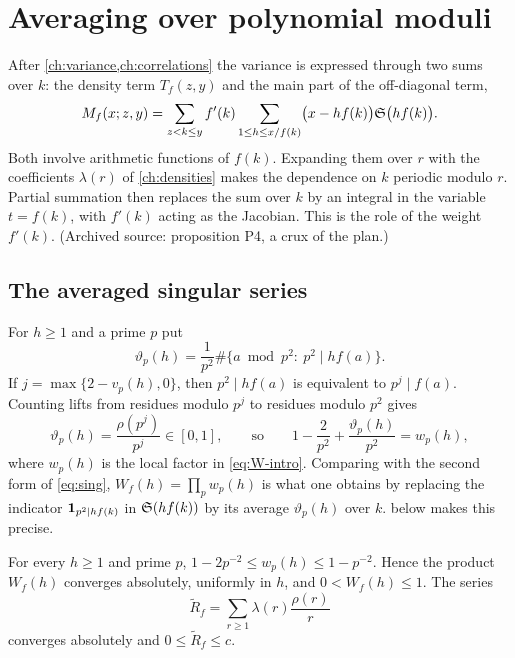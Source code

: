 \chapter{Averaging over polynomial moduli}\label{ch:averaging}

After \cref{ch:variance,ch:correlations} the variance is expressed through two sums over $k$: the density term $T_f(z,y)$ and the main part of the off-diagonal term,
\begin{equation}\label{eq:Mf}
M_f(x;z,y)=\sum_{z<k\le y}f'(k)\sum_{1\le h\le x/f(k)}\bigl(x-hf(k)\bigr)\mathfrak S\bigl(hf(k)\bigr).
\end{equation}
Both involve arithmetic functions of $f(k)$. Expanding them over $r$ with the coefficients $\lambda(r)$ of \cref{ch:densities} makes the dependence on $k$ periodic modulo $r$. Partial summation then replaces the sum over $k$ by an integral in the variable $t=f(k)$, with $f'(k)$ acting as the Jacobian. This is the role of the weight $f'(k)$. (Archived source: proposition P4, a crux of the plan.)

\section{The averaged singular series}

For $h\ge1$ and a prime $p$ put
\[
\vartheta_p(h)=\frac1{p^2}\#\{a\bmod p^2:\ p^2\mid hf(a)\}.
\]
If $j=\max\{2-v_p(h),0\}$, then $p^2\mid hf(a)$ is equivalent to $p^j\mid f(a)$. Counting lifts from residues modulo $p^j$ to residues modulo $p^2$ gives
\begin{equation}\label{eq:deltap}
\vartheta_p(h)=\frac{\rho(p^{j})}{p^{j}}\in[0,1],\qquad\text{so}\qquad
1-\frac2{p^2}+\frac{\vartheta_p(h)}{p^2}=w_p(h),
\end{equation}
where $w_p(h)$ is the local factor in \eqref{eq:W-intro}. Comparing with the second form of \eqref{eq:sing}, $W_f(h)=\prod_pw_p(h)$ is what one obtains by replacing the indicator $\mathbf 1_{p^2\mid hf(k)}$ in $\mathfrak S(hf(k))$ by its average $\vartheta_p(h)$ over $k$.  below makes this precise.

\begin{lemma}\label{lem:W-basic}
For every $h\ge1$ and prime $p$, $1-2p^{-2}\le w_p(h)\le1-p^{-2}$. Hence the product $W_f(h)$ converges absolutely, uniformly in $h$, and $0<W_f(h)\le1$. The series
\[
\widetilde R_f=\sum_{r\ge1}\lambda(r)\frac{\rho(r)}r
\]
converges absolutely and $0\le\widetilde R_f\le c$.
\end{lemma}

